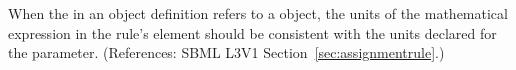 When the  in an \AssignmentRule object definition refers to
a \Parameter object, the units of the mathematical expression in the rule's
 element should be consistent with the units declared for the
parameter.  (References: SBML L3V1 Section~\ref{sec:assignmentrule}.)
